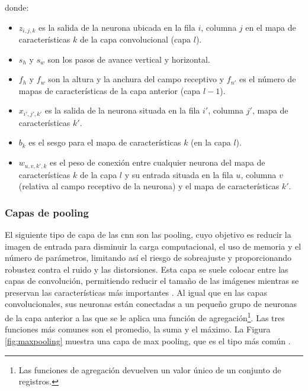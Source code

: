 donde:
\begin{itemize}
    \item \( z_{i,j,k} \) es la salida de la neurona ubicada en la fila \(i\), columna \(j\) en el mapa de características \(k\) de la capa convolucional (capa \(l\)).
    \item \( s_h \) y \( s_w \) son los pasos de avance vertical y horizontal.
    \item \( f_h \) y \( f_w \) son la altura y la anchura del campo receptivo y \( f_{n'} \) es el número de mapas de características de la capa anterior (capa \(l-1\)).
    \item \( x_{i',j',k'} \) es la salida de la neurona situada en la fila \(i'\), columna \(j'\), mapa de características \(k'\).
    \item \( b_k \) es el sesgo para el mapa de características \(k\) (en la capa \(l\)).
    \item \( w_{u,v,k',k} \) es el peso de conexión entre cualquier neurona del mapa de características \(k\) de la capa \(l\) y su entrada situada en la fila \(u\), columna \(v\) (relativa al campo receptivo de la neurona) y el mapa de características \(k'\).
\end{itemize}





\subsubsection*{Capas de pooling}

El siguiente tipo de capa de las \acrshort{cnn} son las pooling, cuyo objetivo es reducir la imagen de entrada para disminuir la carga computacional, el uso de memoria y el número de parámetros, limitando así el riesgo de sobreajuste y proporcionando robustez contra el ruido y las distorsiones. Esta capa se suele colocar entre las capas de convolución, permitiendo reducir el tamaño de las imágenes mientras se preservan las características más importantes \citep{podder2021artificial}. Al igual que en las capas convolucionales, sus neuronas están conectadas a un pequeño grupo de neuronas de la capa anterior a las que se le aplica una función de agregación\footnote{Las funciones de agregación devuelven un valor único de un conjunto de registros.}. Las tres funciones más comunes son el promedio, la suma y el máximo. La Figura \ref{fig:maxpooling} muestra una capa de max pooling, que es el tipo más común \citep{geron2022hands}. 



